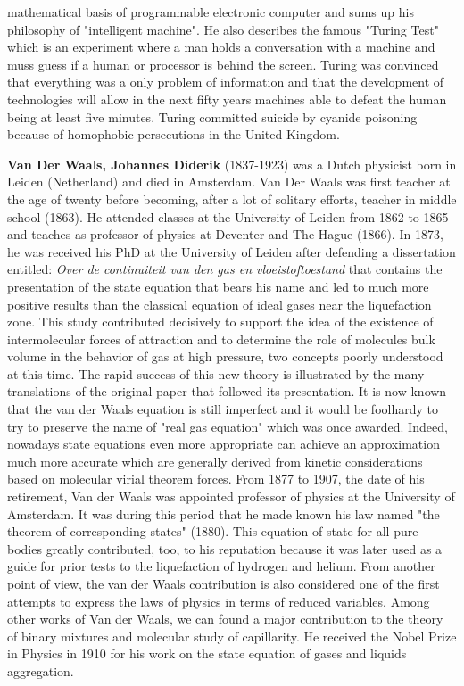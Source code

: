mathematical basis of programmable electronic computer and sums up his philosophy of "intelligent machine". He also describes the famous "Turing Test" which is an experiment where a man holds a conversation with a machine and muss guess if a human or processor is behind the screen. Turing was convinced that everything was a only problem of information and that the development of technologies will allow in the next fifty years machines able to defeat the human being at least five minutes. Turing committed suicide by cyanide poisoning because of homophobic persecutions in the United-Kingdom.

{}

\textbf{Van Der Waals, Johannes Diderik} (1837-1923) was a Dutch physicist born in Leiden (Netherland) and died in Amsterdam. Van Der Waals was first teacher at the age of twenty before becoming, after a lot of solitary efforts, teacher in middle school (1863). He attended classes at the University of Leiden from 1862 to 1865 and teaches as professor of physics at Deventer and The Hague (1866). In 1873, he was received his PhD at the University of Leiden after defending a dissertation entitled: \textit{Over de continuiteit van den gas en vloeistoftoestand} that contains the presentation of the state equation that bears his name and led to much more positive results than the classical equation of ideal gases near the liquefaction zone. This study contributed decisively to support the idea of the existence of intermolecular forces of attraction and to determine the role of molecules bulk volume in the behavior of gas at high pressure, two concepts poorly understood at this time. The rapid success of this new theory is illustrated by the many translations of the original paper that followed its presentation. It is now known that the van der Waals equation is still imperfect and it would be foolhardy to try to preserve the name of "real gas equation" which was once awarded. Indeed, nowadays state equations even more appropriate can achieve an approximation much more accurate which are generally derived from kinetic considerations based on molecular virial theorem forces. From 1877 to 1907, the date of his retirement, Van der Waals was appointed professor of physics at the University of Amsterdam. It was during this period that he made known his law named "the theorem of corresponding states" (1880). This equation of state for all pure bodies greatly contributed, too, to his reputation because it was later used as a guide for prior tests to the liquefaction of hydrogen and helium. From another point of view, the van der Waals contribution is also considered one of the first attempts to express the laws of physics in terms of reduced variables. Among other works of Van der Waals, we can found a major contribution to the theory of binary mixtures and molecular study of capillarity. He received the Nobel Prize in Physics in 1910 for his work on the state equation of gases and liquids aggregation.


